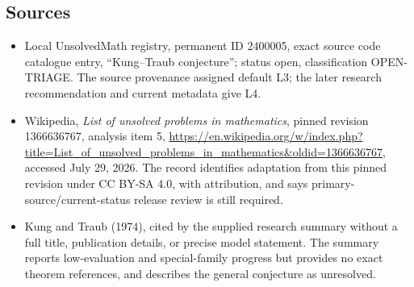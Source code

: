 \documentclass[11pt]{article}
\begin{document}
\subsection{Sources}
\begin{itemize}
\item Local UnsolvedMath registry, permanent ID 2400005, exact source code catalogue entry, ``Kung--Traub conjecture''; status open, classification OPEN-TRIAGE. The source provenance assigned default L3; the later research recommendation and current metadata give L4.
\item Wikipedia, \emph{List of unsolved problems in mathematics}, pinned revision 1366636767, analysis item 5, \url{https://en.wikipedia.org/w/index.php?title=List_of_unsolved_problems_in_mathematics&oldid=1366636767}, accessed July 29, 2026. The record identifies adaptation from this pinned revision under CC BY-SA 4.0, with attribution, and says primary-source/current-status release review is still required.
\item Kung and Traub (1974), cited by the supplied research summary without a full title, publication details, or precise model statement. The summary reports low-evaluation and special-family progress but provides no exact theorem references, and describes the general conjecture as unresolved.
\end{itemize}
\end{document}
